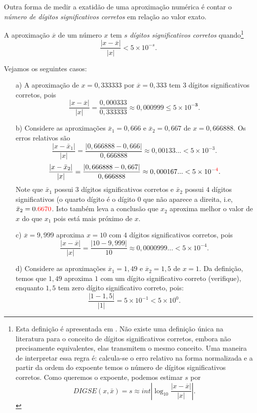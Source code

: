Outra forma de medir a exatidão de uma aproximação numérica é contar o \emph{número de dígitos significativos corretos} em relação ao valor exato.

\begin{defn}
A aproximação $\overline{x}$ de um número $x$ tem $s$ \emph{dígitos significativos corretos} quando\footnote{Esta definição é apresentada em \cite{Burden2013}. Não existe uma definição única na literatura para o conceito de dígitos significativos corretos, embora não precisamente equivalentes, elas transmitem o mesmo conceito.
Uma maneira de interpretar essa regra é: calcula-se o erro relativo na forma normalizada e a partir da ordem do expoente temos o número de dígitos significativos corretos. Como queremos o expoente, podemos estimar $s$ por
$$ DIGSE(x,\bar{x})=s \approx int \left|\log_{10} \frac{|x-\overline{x}|}{|x|}\right|. $$
}
$$
\frac{|x-\overline{x}|}{|x|} < 5\times 10^{-s}.
$$
\end{defn}


\begin{ex} Vejamos os seguintes casos:
\begin{itemize}
\item[a)] A aproximação de $x=0,333333$ por $\overline{x}=0,333$ tem $3$ dígitos significativos corretos, pois
  \begin{equation*}
    \frac{|x-\overline{x}|}{|x|} = \frac{0,000333}{0,333333} \approx 0,000999 \leq 5\times 10^{-\pmb{3}}.
  \end{equation*}
\item[b)] Considere as aproximações $\bar{x}_1=0,666$ e $\bar{x}_2=0,667$ de $x=0,666888$. Os erros relativos são
  $$
    \frac{|x-\bar{x}_1|}{|x|} = \frac{|0,666888-0,666|}{0,666888} \approx 0,00133...< 5\times 10^{-3}.
  $$
  $$
    \frac{|x-\bar{x}_2|}{|x|} = \frac{|0,666888-0,667|}{0,666888} \approx 0,000167...< 5\times 10^{-{\color{red}{4}}}.
  $$
  Note que $\bar{x}_1$ possui $3$ dígitos significativos corretos e $\bar{x}_2$ possui $4$ dígitos significativos (o quarto dígito é o dígito $0$ que não aparece a direita, i.e, $\bar{x}_2=0.{\color{red}{6670}}$. Isto também leva a conclusão que $x_2$ aproxima melhor o valor de $x$ do que $x_1$ pois está mais próximo de $x$.
  
\item[c)] $\overline{x} = 9,999$ aproxima $x = 10$ com $4$ dígitos significativos corretos, pois  
  \begin{equation*}
    \frac{|x-\overline{x}|}{|x|} = \frac{|10 - 9,999|}{10} \approx 0,0000999...< 5\times 10^{-4}.
  \end{equation*}
\item[d)] Considere as aproximações $\overline{x}_1 = 1,49$ e $\overline{x}_2 = 1,5$ de $x = 1$. Da definição, temos que $1,49$ aproxima $1$ com um dígito significativo correto (verifique), enquanto $1,5$ tem zero dígito significativo correto, pois:
  \begin{equation*}
    \frac{|1-1,5|}{|1|} = 5\times 10^{-1} < 5\times 10^{0}.
  \end{equation*}
\end{itemize}
\end{ex}

